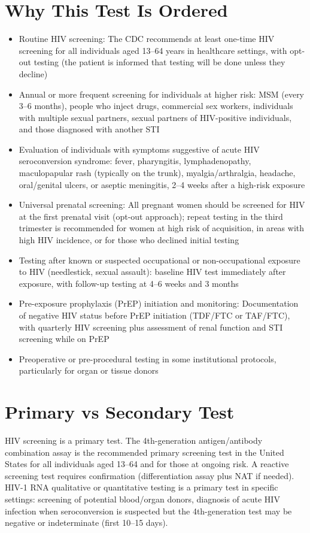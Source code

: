 \section*{Why This Test Is Ordered}
\begin{itemize}
  \item Routine HIV screening: The CDC recommends at least one-time HIV screening for all individuals aged 13--64 years in healthcare settings, with opt-out testing (the patient is informed that testing will be done unless they decline) \cite{cdc2006revised}
  \item Annual or more frequent screening for individuals at higher risk: MSM (every 3--6 months), people who inject drugs, commercial sex workers, individuals with multiple sexual partners, sexual partners of HIV-positive individuals, and those diagnosed with another STI
  \item Evaluation of individuals with symptoms suggestive of acute HIV seroconversion syndrome: fever, pharyngitis, lymphadenopathy, maculopapular rash (typically on the trunk), myalgia/arthralgia, headache, oral/genital ulcers, or aseptic meningitis, 2--4 weeks after a high-risk exposure \cite{daar2001diagnosis}
  \item Universal prenatal screening: All pregnant women should be screened for HIV at the first prenatal visit (opt-out approach); repeat testing in the third trimester is recommended for women at high risk of acquisition, in areas with high HIV incidence, or for those who declined initial testing
  \item Testing after known or suspected occupational or non-occupational exposure to HIV (needlestick, sexual assault): baseline HIV test immediately after exposure, with follow-up testing at 4--6 weeks and 3 months
  \item Pre-exposure prophylaxis (PrEP) initiation and monitoring: Documentation of negative HIV status before PrEP initiation (TDF/FTC or TAF/FTC), with quarterly HIV screening plus assessment of renal function and STI screening while on PrEP
  \item Preoperative or pre-procedural testing in some institutional protocols, particularly for organ or tissue donors
\end{itemize}

\section*{Primary vs Secondary Test}
HIV screening is a primary test. The 4th-generation antigen/antibody combination assay is the recommended primary screening test in the United States for all individuals aged 13--64 and for those at ongoing risk. A reactive screening test requires confirmation (differentiation assay plus NAT if needed). HIV-1 RNA qualitative or quantitative testing is a primary test in specific settings: screening of potential blood/organ donors, diagnosis of acute HIV infection when seroconversion is suspected but the 4th-generation test may be negative or indeterminate (first 10--15 days).

